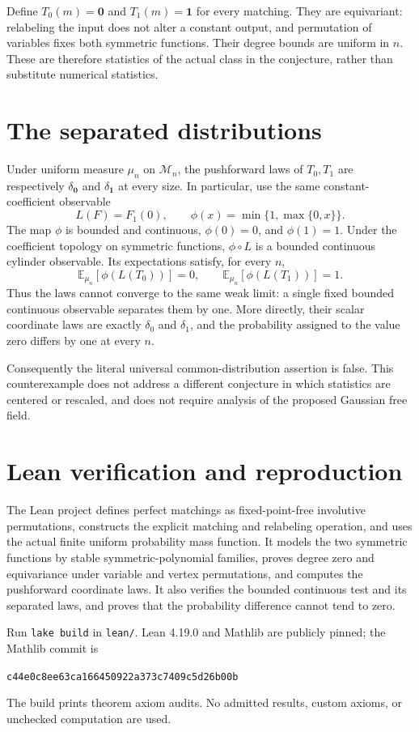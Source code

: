 \documentclass[11pt]{article}
\begin{document}
Define $T_0(m)=\mathbf0$ and $T_1(m)=\mathbf1$ for every matching. They are equivariant: relabeling the input does not alter a constant output, and permutation of variables fixes both symmetric functions. Their degree bounds are uniform in $n$. These are therefore statistics of the actual class in the conjecture, rather than substitute numerical statistics.

\section*{The separated distributions}
Under uniform measure $\mu_n$ on $\mathcal M_n$, the pushforward laws of $T_0,T_1$ are respectively $\delta_{\mathbf0}$ and $\delta_{\mathbf1}$ at every size. In particular, use the same constant-coefficient observable
\[
 L(F)=F_1(0),\qquad \phi(x)=\min\{1,\max\{0,x\}\}.
\]
The map $\phi$ is bounded and continuous, $\phi(0)=0$, and $\phi(1)=1$. Under the coefficient topology on symmetric functions, $\phi\circ L$ is a bounded continuous cylinder observable. Its expectations satisfy, for every $n$,
\[
 \mathbb E_{\mu_n}[\phi(L(T_0))]=0,
 \qquad \mathbb E_{\mu_n}[\phi(L(T_1))]=1.
\]
Thus the laws cannot converge to the same weak limit: a single fixed bounded continuous observable separates them by one. More directly, their scalar coordinate laws are exactly $\delta_0$ and $\delta_1$, and the probability assigned to the value zero differs by one at every $n$.

Consequently the literal universal common-distribution assertion is false. This counterexample does not address a different conjecture in which statistics are centered or rescaled, and does not require analysis of the proposed Gaussian free field.

\section*{Lean verification and reproduction}
The Lean project defines perfect matchings as fixed-point-free involutive permutations, constructs the explicit matching and relabeling operation, and uses the actual finite uniform probability mass function. It models the two symmetric functions by stable symmetric-polynomial families, proves degree zero and equivariance under variable and vertex permutations, and computes the pushforward coordinate laws. It also verifies the bounded continuous test and its separated laws, and proves that the probability difference cannot tend to zero.

Run \texttt{lake build} in \texttt{lean/}. Lean 4.19.0 and Mathlib are publicly pinned; the Mathlib commit is
\begin{center}\small\texttt{c44e0c8ee63ca166450922a373c7409c5d26b00b}\end{center}
The build prints theorem axiom audits. No admitted results, custom axioms, or unchecked computation are used.
\end{document}
